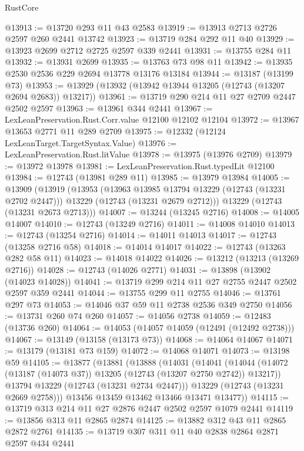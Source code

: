 \begin{lexlean}{RustCore}
\begin{coremodule}
@13913 := @13720 @293 @11 @43 @2583
@13919 := @13913 @2713 @2726 @2597 @260 @2441 @13742
@13923 := @13719 @284 @292 @11 @40
@13929 := @13923 @2699 @2712 @2725 @2597 @339 @2441
@13931 := @13755 @284 @11
@13932 := @13931 @2699
@13935 := @13763 @73 @98 @11
@13942 := @13935 @2530 @2536 @229 @2694 @13778 @13176 @13184
@13944 := @13187 (@13199 @73)
@13953 := @13929 (@13932 (@13942 @13944 @13205 (@12743 (@13207 @2694 @2683)) @13217))
@13961 := @13719 @290 @214 @11 @27 @2709 @2447 @2502 @2597
@13963 := @13961 @344 @2441
@13967 := LexLeanPreservation.Rust.Corr.value @12100 @12102 @12104
@13972 := @13967 @13653 @2771 @11 @289 @2709
@13975 := @12332 (@12124 LexLeanTarget.TargetSyntax.Value)
@13976 := LexLeanPreservation.Rust.litValue
@13978 := @13975 (@13976 @2709)
@13979 := @13972 @13978
@13981 := LexLeanPreservation.Rust.typedLit @12100
@13984 := @12743 (@13981 @289 @11)
@13985 := @13979 @13984
@14005 := @13909
    (@13919
      (@13953
        (@13963 @13985 @13794 @13229 (@12743 (@13231 @2702 @2447)))
        @13229
        (@12743 (@13231 @2679 @2712)))
      @13229
      (@12743 (@13231 @2673 @2713)))
@14007 := @13244 (@13245 @2716)
@14008 := @14005 @14007
@14010 := @12743 (@13249 @2716)
@14011 := @14008 @14010
@14013 := @12743 (@13254 @2716)
@14014 := @14011 @14013
@14017 := @12743 (@13258 @2716 @58)
@14018 := @14014 @14017
@14022 := @12743 (@13263 @282 @58 @11)
@14023 := @14018 @14022
@14026 := @13212 (@13213 (@13269 @2716))
@14028 := @12743 (@14026 @2771)
@14031 := @13898 (@13902 (@14023 @14028))
@14041 := @13719 @299 @214 @11 @27 @2755 @2447 @2502 @2597 @359 @2441
@14044 := @13755 @299 @11 @2755
@14046 := @13761 @297 @73
@14053 := @14046 @37 @59 @11 @2738 @2536 @349 @2750
@14056 := @13731 @260 @74 @260
@14057 := @14056 @2738
@14059 := @12483 (@13736 @260)
@14064 := @14053 (@14057 @14059 (@12491 (@12492 @2738)))
@14067 := @13149 (@13158 (@13173 @73))
@14068 := @14064 @14067
@14071 := @13179 (@13181 @73 @159)
@14072 := @14068 @14071
@14073 := @13198 @59
@14105 := @13877
    (@13881
      (@13888
        (@14031
          (@14041
            (@14044 (@14072 (@13187 (@14073 @37)) @13205 (@12743 (@13207 @2750 @2742)) @13217))
            @13794
            @13229
            (@12743 (@13231 @2734 @2447)))
          @13229
          (@12743 (@13231 @2669 @2758)))
        @13456
        @13459
        @13462
        @13466
        @13471
        @13477))
@14115 := @13719 @313 @214 @11 @27 @2876 @2447 @2502 @2597 @1079 @2441
@14119 := @13856 @313 @11 @2865 @2874
@14125 := @13882 @312 @43 @11 @2865 @2872 @2761
@14135 := @13719 @307 @311 @11 @40 @2838 @2864 @2871 @2597 @434 @2441

\end{coremodule}
\end{lexlean}
